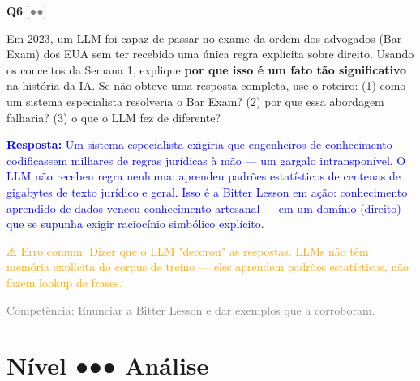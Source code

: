 \documentclass[12pt,a4paper]{article}
\newcommand{\sol}[1]{\textcolor{blue}{#1}}
\newcommand{\errocomum}[1]{\textcolor{orange}{⚠️ Erro comum: #1}}
\newcommand{\competencia}[1]{\textcolor{gray}{Competência: #1}}
\newcommand{\sol}[1]{}
\newcommand{\errocomum}[1]{}
\newcommand{\competencia}[1]{}
\newcommand{\sol}[1]{}
\newcommand{\errocomum}[1]{}
\newcommand{\competencia}[1]{}
\newcommand{\nivel}[1]{\textcolor{gray}{[#1]}}
\newenvironment{questao}[2]{
  \vspace{0.5cm}
  \noindent\textbf{Q#1} \nivel{#2} \quad
}{
  \vspace{0.2cm}
}
\begin{document}
\begin{questao}{6}{●●}
  Em 2023, um LLM foi capaz de passar no exame da ordem dos advogados (Bar Exam)
  dos EUA sem ter recebido uma única regra explícita sobre direito. Usando os
  conceitos da Semana 1, explique \textbf{por que isso é um fato tão significativo}
  na história da IA. Se não obteve uma resposta completa, use o roteiro:
  (1) como um sistema especialista resolveria o Bar Exam? (2) por que essa abordagem
  falharia? (3) o que o LLM fez de diferente?

  \sol{
    \textbf{Resposta:} Um sistema especialista exigiria que engenheiros de conhecimento
    codificassem milhares de regras jurídicas à mão — um gargalo intransponível. O LLM
    não recebeu regra nenhuma: aprendeu padrões estatísticos de centenas de gigabytes
    de texto jurídico e geral. Isso é a Bitter Lesson em ação: conhecimento aprendido
    de dados venceu conhecimento artesanal — em um domínio (direito) que se supunha
    exigir raciocínio simbólico explícito.

    \errocomum{Dizer que o LLM "decorou" as respostas. LLMs não têm memória explícita do
    corpus de treino — eles aprendem padrões estatísticos, não fazem lookup de frases.}

    \competencia{Enunciar a Bitter Lesson e dar exemplos que a corroboram.}
  }
\end{questao}

\section*{Nível ●●● \quad Análise}
\end{document}
